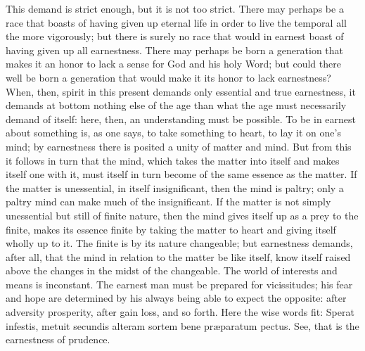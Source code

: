 \documentclass[12pt]{book}
\newcommand{\opage}[1]{\marginnote{\footnotesize\textit{[#1]}}}
\begin{document}
\opage{13}\setcounter{footnote}{0}%
This demand is strict enough, but it is not too strict. There may
perhaps be a race that boasts of having given up eternal life in order
to live the temporal all the more vigorously; but there is surely no
race that would in earnest boast of having given up all earnestness.
There may perhaps be born a generation that makes it an honor to lack
a sense for God and his holy Word; but could there well be born a
generation that would make it its honor to lack earnestness? When,
then, spirit in this present demands only essential and true
earnestness, it demands at bottom nothing else of the age than what the
age must necessarily demand of itself: here, then, an understanding must
be possible. To be in earnest about something is, as one says, to take
something to heart, to lay it on one's mind; by earnestness there is
posited a unity of matter and mind. But from this it follows in turn
that the mind, which takes the matter into itself and makes itself one
with it, must itself in turn become of the same essence as the matter.
If the matter is unessential, in itself insignificant, then the mind is
paltry; only a paltry mind can make much of the insignificant. If the
matter is not simply unessential but still of finite nature, then the
mind gives itself up as a prey to the finite, makes its essence finite
by taking the matter to heart and giving itself wholly up to it. The
finite is by its nature changeable; but earnestness demands, after all,
that the mind in relation to the matter be like itself, know itself
raised above the changes in the midst of the changeable. The world of
interests and means is inconstant. The earnest man must be prepared for
vicissitudes; his fear and hope are determined by his always being able
to expect the opposite: after adversity prosperity, after gain loss, and
so forth. Here the wise words fit: Sperat infestis, metuit secundis
alteram sortem
\opage{14}\setcounter{footnote}{0}%
bene præparatum pectus. See, that is the earnestness of prudence.
\end{document}
